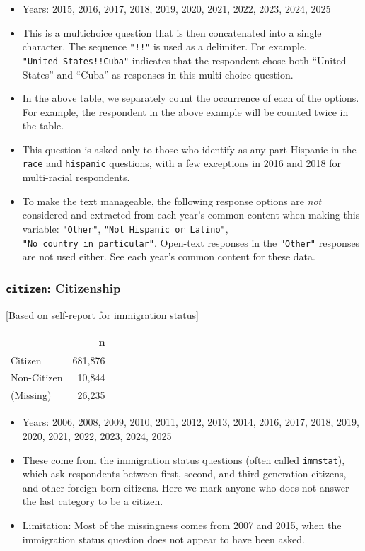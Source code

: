 \documentclass[10pt,article,oneside]{memoir}
\begin{document}
\begin{itemize}
\tightlist
\item
  Years: 2015, 2016, 2017, 2018, 2019, 2020, 2021, 2022, 2023, 2024,
  2025
\item
  This is a multichoice question that is then concatenated into a single
  character. The sequence \texttt{"!!"} is used as a delimiter. For
  example, \texttt{"United\ States!!Cuba"} indicates that the respondent
  chose both ``United States'' and ``Cuba'' as responses in this
  multi-choice question.
\item
  In the above table, we separately count the occurrence of each of the
  options. For example, the respondent in the above example will be
  counted twice in the table.
\item
  This question is asked only to those who identify as any-part Hispanic
  in the \texttt{race} and \texttt{hispanic} questions, with a few
  exceptions in 2016 and 2018 for multi-racial respondents.
\item
  To make the text manageable, the following response options are
  \emph{not} considered and extracted from each year's common content
  when making this variable: \texttt{"Other"},
  \texttt{"Not\ Hispanic\ or\ Latino"},
  \texttt{"No\ country\ in\ particular"}. Open-text responses in the
  \texttt{"Other"} responses are not used either. See each year's common
  content for these data.
\end{itemize}

\subsubsection{\texorpdfstring{\texttt{citizen}:
Citizenship}{citizen: Citizenship}}\label{citizen-citizenship}

{[}Based on self-report for immigration status{]}

\begin{table}[H]
\centering
\begin{tabular}[t]{lr}
\toprule
 & n\\
\midrule
Citizen & 681,876\\
Non-Citizen & 10,844\\
(Missing) & 26,235\\
\bottomrule
\end{tabular}
\end{table}

\begin{itemize}
\tightlist
\item
  Years: 2006, 2008, 2009, 2010, 2011, 2012, 2013, 2014, 2016, 2017,
  2018, 2019, 2020, 2021, 2022, 2023, 2024, 2025
\item
  These come from the immigration status questions (often called
  \texttt{immstat}), which ask respondents between first, second, and
  third generation citizens, and other foreign-born citizens. Here we
  mark anyone who does not answer the last category to be a citizen.
\item
  Limitation: Most of the missingness comes from 2007 and 2015, when the
  immigration status question does not appear to have been asked.
\end{itemize}
\end{document}

